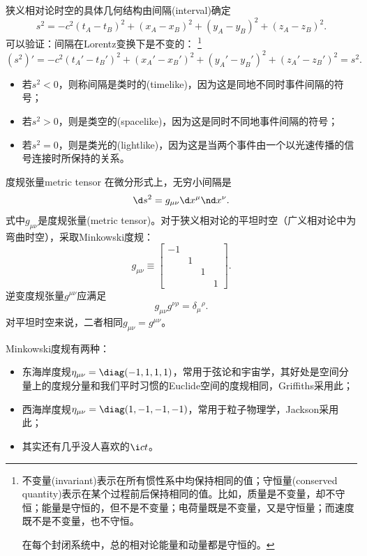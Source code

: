狭义相对论时空的具体几何结构由间隔(interval)确定
\[
    s^2=-c^2(t_A-t_B)^2+(x_A-x_B)^2+(y_A-y_B)^2+(z_A-z_B)^2.
\]
可以验证：间隔在Lorentz变换下是不变的：
\footnote{
不变量(invariant)表示在所有惯性系中均保持相同的值；守恒量(conserved quantity)表示在某个过程前后保持相同的值。比如，质量是不变量，却不守恒；能量是守恒的，但不是不变量；电荷量既是不变量，又是守恒量；而速度既不是不变量，也不守恒。

在每个封闭系统中，总的相对论能量和动量都是守恒的。
}
\[
    (s^2)'=-c^2(t_A'-t_B')^2+(x_A'-x_B')^2+(y_A'-y_B')^2+(z_A'-z_B')^2=s^2.
\]
\begin{itemize}
    \item 若$s^2<0$，则称间隔是类时的(timelike)，因为这是同地不同时事件间隔的符号；
    \item 若$s^2>0$，则是类空的(spacelike)，因为这是同时不同地事件间隔的符号；
    \item 若$s^2=0$，则是类光的(lightlike)，因为这是当两个事件由一个以光速传播的信号连接时所保持的关系。
\end{itemize}
\begin{definition}
    {度规张量}{metric tensor}
    在微分形式上，无穷小间隔是
    \begin{equation}
        \d s^2=g_{\mu\nu}\d x^\mu\nd x^\nu.
    \end{equation}
    式中$g_{\mu\nu}$是度规张量(metric tensor)。对于狭义相对论的平坦时空（广义相对论中为弯曲时空），采取Minkowski度规：
    \begin{equation}
        g_{\mu\nu}\equiv
        \begin{bmatrix}
            -1\\ &1\\ &&1\\ &&&1
        \end{bmatrix}.
    \end{equation}
    逆变度规张量$g^{\mu\nu}$应满足
    \begin{equation}
        g_{\mu\nu}g^{\nu\rho}=\delta_\mu{}^\rho.
    \end{equation}
    对平坦时空来说，二者相同$g_{\mu\nu}=g^{\mu\nu}$。
\end{definition}
\begin{remark}
    Minkowski度规有两种：
    \begin{itemize}
        \item 东海岸度规$\eta_{\mu\nu}=\diag(-1,1,1,1)$，常用于弦论和宇宙学，其好处是空间分量上的度规分量和我们平时习惯的Euclide空间的度规相同，Griffiths采用此；
        \item 西海岸度规$\eta_{\mu\nu}=\diag(1,-1,-1,-1)$，常用于粒子物理学，Jackson采用此；
        \item 其实还有几乎没人喜欢的$\i ct$。
    \end{itemize}
\end{remark}


